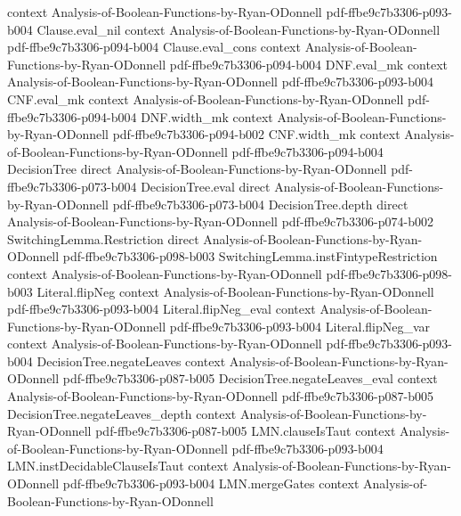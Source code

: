 \begin{theorem}
  {context}
  {Analysis-of-Boolean-Functions-by-Ryan-ODonnell}
  {pdf-ffbe9c7b3306-p093-b004}
\proofstep
  {Clause.eval_nil}
  {context}
  {Analysis-of-Boolean-Functions-by-Ryan-ODonnell}
  {pdf-ffbe9c7b3306-p094-b004}
\proofstep
  {Clause.eval_cons}
  {context}
  {Analysis-of-Boolean-Functions-by-Ryan-ODonnell}
  {pdf-ffbe9c7b3306-p094-b004}
\proofstep
  {DNF.eval_mk}
  {context}
  {Analysis-of-Boolean-Functions-by-Ryan-ODonnell}
  {pdf-ffbe9c7b3306-p093-b004}
\proofstep
  {CNF.eval_mk}
  {context}
  {Analysis-of-Boolean-Functions-by-Ryan-ODonnell}
  {pdf-ffbe9c7b3306-p094-b004}
\proofstep
  {DNF.width_mk}
  {context}
  {Analysis-of-Boolean-Functions-by-Ryan-ODonnell}
  {pdf-ffbe9c7b3306-p094-b002}
\proofstep
  {CNF.width_mk}
  {context}
  {Analysis-of-Boolean-Functions-by-Ryan-ODonnell}
  {pdf-ffbe9c7b3306-p094-b004}
\proofstep
  {DecisionTree}
  {direct}
  {Analysis-of-Boolean-Functions-by-Ryan-ODonnell}
  {pdf-ffbe9c7b3306-p073-b004}
\proofstep
  {DecisionTree.eval}
  {direct}
  {Analysis-of-Boolean-Functions-by-Ryan-ODonnell}
  {pdf-ffbe9c7b3306-p073-b004}
\proofstep
  {DecisionTree.depth}
  {direct}
  {Analysis-of-Boolean-Functions-by-Ryan-ODonnell}
  {pdf-ffbe9c7b3306-p074-b002}
\proofstep
  {SwitchingLemma.Restriction}
  {direct}
  {Analysis-of-Boolean-Functions-by-Ryan-ODonnell}
  {pdf-ffbe9c7b3306-p098-b003}
\proofstep
  {SwitchingLemma.instFintypeRestriction}
  {context}
  {Analysis-of-Boolean-Functions-by-Ryan-ODonnell}
  {pdf-ffbe9c7b3306-p098-b003}
\proofstep
  {Literal.flipNeg}
  {context}
  {Analysis-of-Boolean-Functions-by-Ryan-ODonnell}
  {pdf-ffbe9c7b3306-p093-b004}
\proofstep
  {Literal.flipNeg_eval}
  {context}
  {Analysis-of-Boolean-Functions-by-Ryan-ODonnell}
  {pdf-ffbe9c7b3306-p093-b004}
\proofstep
  {Literal.flipNeg_var}
  {context}
  {Analysis-of-Boolean-Functions-by-Ryan-ODonnell}
  {pdf-ffbe9c7b3306-p093-b004}
\proofstep
  {DecisionTree.negateLeaves}
  {context}
  {Analysis-of-Boolean-Functions-by-Ryan-ODonnell}
  {pdf-ffbe9c7b3306-p087-b005}
\proofstep
  {DecisionTree.negateLeaves_eval}
  {context}
  {Analysis-of-Boolean-Functions-by-Ryan-ODonnell}
  {pdf-ffbe9c7b3306-p087-b005}
\proofstep
  {DecisionTree.negateLeaves_depth}
  {context}
  {Analysis-of-Boolean-Functions-by-Ryan-ODonnell}
  {pdf-ffbe9c7b3306-p087-b005}
\proofstep
  {LMN.clauseIsTaut}
  {context}
  {Analysis-of-Boolean-Functions-by-Ryan-ODonnell}
  {pdf-ffbe9c7b3306-p093-b004}
\proofstep
  {LMN.instDecidableClauseIsTaut}
  {context}
  {Analysis-of-Boolean-Functions-by-Ryan-ODonnell}
  {pdf-ffbe9c7b3306-p093-b004}
\proofstep
  {LMN.mergeGates}
  {context}
  {Analysis-of-Boolean-Functions-by-Ryan-ODonnell}

\end{theorem}
